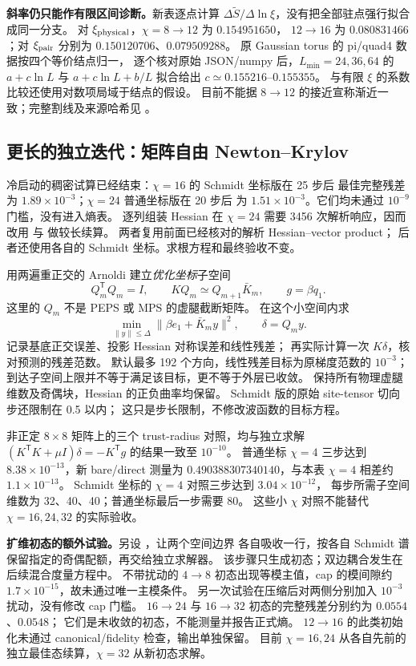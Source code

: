 \textbf{斜率仍只能作有限区间诊断。}新表逐点计算
$\Delta\widetilde S/\Delta\ln\xi$，没有把全部驻点强行拟合成同一分支。
对 $\xi_{\rm physical}$，$\chi=8\to12$ 为 $0.154951650$，
$12\to16$ 为 $0.080831466$；对 $\xi_{\rm pair}$ 分别为
$0.150120706$、$0.079509288$。
原 Gaussian torus 的 pi/quad4 数据按四个等价结点归一，
逐个核对原始 JSON/numpy 后，$L_{\min}=24,36,64$ 的
$a+c\ln L$ 与 $a+c\ln L+b/L$ 拟合给出 $c\simeq0.155216$--$0.155355$。
与有限 $\xi$ 的系数比较还使用对数项局域于结点的假设。
目前不能据 $8\to12$ 的接近宣称渐近一致；完整割线及来源哈希见
。

\subsection{更长的独立迭代：矩阵自由 Newton--Krylov}
冷启动的稠密试算已经结束：$\chi=16$ 的 Schmidt 坐标版在 25 步后
最佳完整残差为 $1.89\times10^{-3}$；$\chi=24$ 普通坐标版在 20 步后
为 $1.51\times10^{-3}$。它们均未通过 $10^{-9}$ 门槛，没有进入熵表。
逐列组装 Hessian 在 $\chi=24$ 需要 3456 次解析响应，因而改用
 与  做较长续算。
两者复用前面已经核对的解析 Hessian--vector product；
后者还使用各自的 Schmidt 坐标。求根方程和最终验收不变。

用两遍重正交的 Arnoldi 建立\emph{优化坐标}子空间
\[
 Q_m^\mathsf{T}Q_m=I,\qquad KQ_m\simeq Q_{m+1}\bar K_m,
 \qquad g=\beta q_1.
\]
这里的 $Q_m$ 不是 PEPS 或 MPS 的虚腿截断矩阵。
在这个小空间内求
\[
 \min_{\|y\|\le\Delta}\|\beta e_1+\bar K_m y\|^2,
 \qquad \delta=Q_m y.
\]
记录基底正交误差、投影 Hessian 对称误差和线性残差；
再实际计算一次 $K\delta$，核对预测的残差范数。
默认最多 192 个方向，线性残差目标为原梯度范数的 $10^{-3}$；
到达子空间上限并不等于满足该目标，更不等于外层已收敛。
保持所有物理虚腿维数及奇偶块，Hessian 的正负曲率均保留。
Schmidt 版的原始 site-tensor 切向步还限制在 0.5 以内；
这只是步长限制，不修改波函数的目标方程。

非正定 $8\times8$ 矩阵上的三个 trust-radius 对照，均与独立求解
$(K^\mathsf{T}K+\mu I)\delta=-K^\mathsf{T}g$ 的结果一致至 $10^{-10}$。
普通坐标 $\chi=4$ 三步达到 $8.38\times10^{-13}$，新 bare/direct
测量为 $0.490388307340140$，与本表 $\chi=4$ 相差约 $1.1\times10^{-13}$。
Schmidt 坐标的 $\chi=4$ 对照三步达到 $3.04\times10^{-12}$，
每步所需子空间维数为 32、40、40；普通坐标最后一步需要 80。
这些小 $\chi$ 对照不能替代 $\chi=16,24,32$ 的实际验收。

\textbf{扩维初态的额外试验。}另设 ，让两个空间边界
各自吸收一行，按各自 Schmidt 谱保留指定的奇偶配额，再交给独立求解器。
该步骤只生成初态；双边耦合发生在后续混合度量方程中。
不带扰动的 $4\to8$ 初态出现等模主值，cap 的模间隙约
$1.7\times10^{-15}$，故未通过唯一主模条件。
另一次试验在压缩后对两侧分别加入 $10^{-3}$ 扰动，没有修改 cap 门槛。
$16\to24$ 与 $16\to32$ 初态的完整残差分别约为 $0.0554$、$0.0548$；
它们是未收敛的初态，不能测量并报告正式熵。
$12\to16$ 的此类初始化未通过 canonical/fidelity 检查，输出单独保留。
目前 $\chi=16,24$ 从各自先前的独立最佳态续算，$\chi=32$ 从新初态求解。

